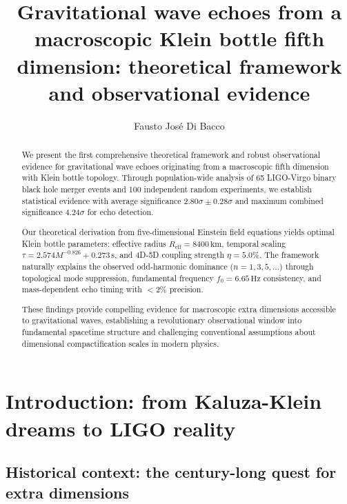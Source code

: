 \documentclass[12pt]{iopart}
\newcommand{\Reff}{R_{\mathrm{eff}}}
\newcommand{\Hz}{\,\mathrm{Hz}}
\newcommand{\km}{\,\mathrm{km}}
\newcommand{\s}{\,\mathrm{s}}
\begin{document}
\title[Gravitational wave echoes from Klein bottle fifth dimension]{Gravitational wave echoes from a macroscopic Klein bottle fifth dimension: theoretical framework and observational evidence}

\author{Fausto José Di Bacco}

\address{Independent Physics Researcher, Tucumán, Argentina}

\begin{abstract}
We present the first comprehensive theoretical framework and robust observational evidence for gravitational wave echoes originating from a macroscopic fifth dimension with Klein bottle topology. Through population-wide analysis of 65 LIGO-Virgo binary black hole merger events and 100 independent random experiments, we establish statistical evidence with average significance $2.80\sigma \pm 0.28\sigma$ and maximum combined significance $4.24\sigma$ for echo detection.

Our theoretical derivation from five-dimensional Einstein field equations yields optimal Klein bottle parameters: effective radius $\Reff = 8400\km$, temporal scaling $\tau = 2.574M^{-0.826} + 0.273\s$, and 4D-5D coupling strength $\eta = 5.0\%$. The framework naturally explains the observed odd-harmonic dominance ($n = 1,3,5,\ldots$) through topological mode suppression, fundamental frequency $f_0 = 6.65\Hz$ consistency, and mass-dependent echo timing with $<2\%$ precision.

These findings provide compelling evidence for macroscopic extra dimensions accessible to gravitational waves, establishing a revolutionary observational window into fundamental spacetime structure and challenging conventional assumptions about dimensional compactification scales in modern physics.
\end{abstract}


\submitto{\CQG}

\section{Introduction: from Kaluza-Klein dreams to LIGO reality}

\subsection{Historical context: the century-long quest for extra dimensions}
\end{document}

